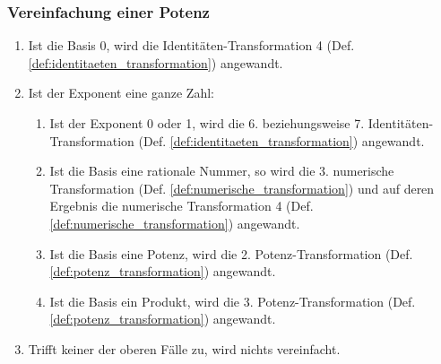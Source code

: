 \documentclass[11pt]{article}
\newcommand{\lab}[1]{(Def. \ref{#1})}
\begin{document}
\subsubsection{Vereinfachung einer Potenz}
\begin{enumerate}
  \item Ist die Basis 0, wird die Identitäten-Transformation 4 \lab{def:identitaeten_transformation} angewandt.
  \item Ist der Exponent eine ganze Zahl:
        \begin{enumerate}
          \item Ist der Exponent 0 oder 1, wird die 6. beziehungsweise 7. Identitäten-Transformation
                \lab{def:identitaeten_transformation} angewandt.
          \item Ist die Basis eine rationale Nummer, so wird die 3. numerische Transformation
                \lab{def:numerische_transformation} und auf deren Ergebnis die numerische 
                Transformation 4 \lab{def:numerische_transformation} angewandt.
          \item Ist die Basis eine Potenz, wird die 2. Potenz-Transformation \lab{def:potenz_transformation} angewandt.
          \item Ist die Basis ein Produkt, wird die 3. Potenz-Transformation \lab{def:potenz_transformation} angewandt.
        \end{enumerate}
  \item Trifft keiner der oberen Fälle zu, wird nichts vereinfacht.
\end{enumerate}
\end{document}
